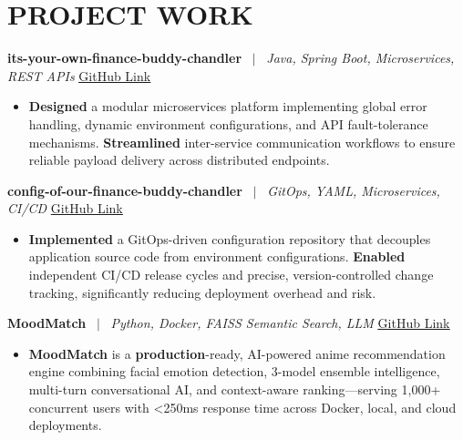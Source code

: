 \documentclass[10pt,a4paper]{article}
\begin{document}

\section*{PROJECT WORK}


\noindent \textbf{its-your-own-finance-buddy-chandler} \ $|$ \ \textit{Java, Spring Boot, Microservices, REST APIs} \hfill \href{https://github.com/Arshdeepdubey/its-your-own-finance-buddy-chandler}{\underline{GitHub Link}}

\begin{itemize}

    \item \textbf{Designed} a modular microservices platform implementing global error handling, dynamic environment configurations, and API fault-tolerance mechanisms. \textbf{Streamlined} inter-service communication workflows to ensure reliable payload delivery across distributed endpoints.

\end{itemize}

\vspace{2pt}

\noindent \textbf{config-of-our-finance-buddy-chandler} \ $|$ \ \textit{GitOps, YAML, Microservices, CI/CD} \hfill \href{https://github.com/Arshdeepdubey/config-of-our-finance-buddy-chandler}{\underline{GitHub Link}}

\begin{itemize}

    \item \textbf{Implemented} a GitOps-driven configuration repository that decouples application source code from environment configurations. \textbf{Enabled} independent CI/CD release cycles and precise, version-controlled change tracking, significantly reducing deployment overhead and risk.

\end{itemize}

\vspace{2pt}

\noindent \textbf{MoodMatch} \ $|$ \ \textit{Python, Docker, FAISS Semantic Search, LLM} \hfill \href{https://github.com/Arshdeepdubey/MoodMatch}{\underline{GitHub Link}}

\begin{itemize}

    \item \textbf{MoodMatch} is a \textbf{production}-ready, AI-powered anime recommendation engine combining facial emotion detection, 3-model ensemble intelligence, multi-turn conversational AI, and context-aware ranking—serving 1,000+ concurrent users with <250ms response time across Docker, local, and cloud deployments.

\end{itemize}
\end{document}
